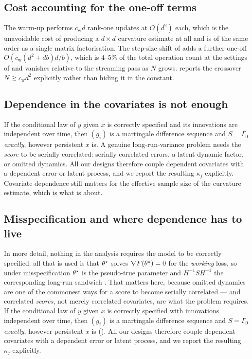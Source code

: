 \subsection{Cost accounting for the one-off terms}
\label{app:costdetail}

The warm-up performs $c_{\mathrm w}d$ rank-one updates at $O(d^2)$ each, which is the unavoidable cost
of producing a $d\times d$ curvature estimate at all and is of the same order as a single matrix
factorisation. The step-size shift of  adds a further one-off
$O(c_{\mathrm w}(d^2+db)d/b)$, which is $4$--$5\%$ of the total operation count at the settings of
 and vanishes relative to the streaming pass as $N$ grows.  reports the
crossover $N\gtrsim c_{\mathrm w}d^2$ explicitly rather than hiding it in the constant.

\subsection{Dependence in the covariates is not enough}
\label{app:mds}

\begin{remark}
\label{rem:mds}
If the conditional law of $y$ given $x$ is correctly specified and its innovations are
independent over time, then $(g_i)$ is a martingale difference sequence and $S=\Gamma_0$
\emph{exactly}, however persistent $x$ is. A genuine long-run-variance problem needs the
\emph{score} to be serially correlated: serially correlated errors, a latent dynamic
factor, or omitted dynamics. All our designs therefore couple dependent covariates with a
dependent error or latent process, and we report the resulting $\kappa_j$ explicitly.
Covariate dependence still matters for the effective sample size of the curvature
estimate, which is what  is about.
\end{remark}

\subsection{Misspecification and where dependence has to live}
\label{app:misspec}

In more detail, nothing in the analysis requires the model to be correctly specified: all that is used is that $\theta^\star$ solves
$\nabla F(\theta^\star)=0$ for the \emph{working} loss, so under misspecification $\theta^\star$ is the pseudo-true
parameter and $H^{-1}SH^{-1}$ the corresponding long-run sandwich
\citep{white1982mle,domowitz1982misspecified}. That matters here, because omitted dynamics are one
of the commonest ways for a score to become serially correlated --- and correlated \emph{scores},
not merely correlated covariates, are what the problem requires. If the conditional law of $y$ given
$x$ is correctly specified with innovations independent over time, then $(g_i)$ is a martingale
difference sequence and $S=\Gamma_0$ \emph{exactly}, however persistent $x$ is (). All
our designs therefore couple dependent covariates with a dependent error or latent process, and we
report the resulting $\kappa_j$ explicitly.


